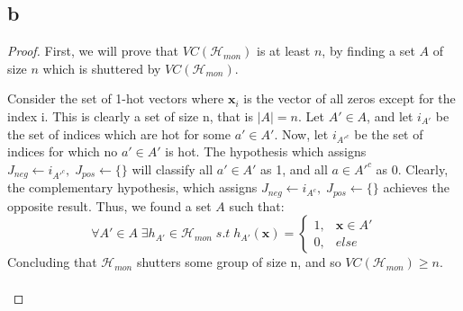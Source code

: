 \subsection*{b}
\begin{proof}
    First, we will prove that $VC(\mathcal{H}_{mon})$ is at least $n$, by finding a set $A$ of size $n$ which is shuttered by $VC(\mathcal{H}_{mon})$.
    
    Consider the set of 1-hot vectors where $\boldsymbol{x}_i$ is the vector of all zeros except for the index i.
    This is clearly a set of size n, that is $|A|=n$.
    Let $A' \in A$, and let $i_{A'}$ be the set of indices which are hot for some $a' \in A'$.
    Now, let $i_{A'^c}$ be the set of indices for which no $a' \in A'$ is hot.
    The hypothesis which assigns $J_{neg} \gets i_{A'^c}, \; J_{pos} \gets \{\}$ will classify all $a' \in A'$ as 1, and all $a \in A'^c$ as 0. Clearly, the complementary hypothesis, which assigns $J_{neg} \gets i_{A^c}, \; J_{pos} \gets \{\}$ achieves the opposite result. Thus, we found a set $A$ such that:
    \begin{equation*}
        \forall A' \in A \; \exists h_{A'} \in \mathcal{H}_{mon} \; s.t \; h_{A'}(\boldsymbol{x}) = 
        \begin{cases}
            1, & \boldsymbol{x} \in A' \\
            0, & else
        \end{cases}
    \end{equation*}
    Concluding that $\mathcal{H}_{mon}$ shutters some group of size n, and so $VC(\mathcal{H}_{mon}) \geq n$. \\\\
    

\end{proof}
